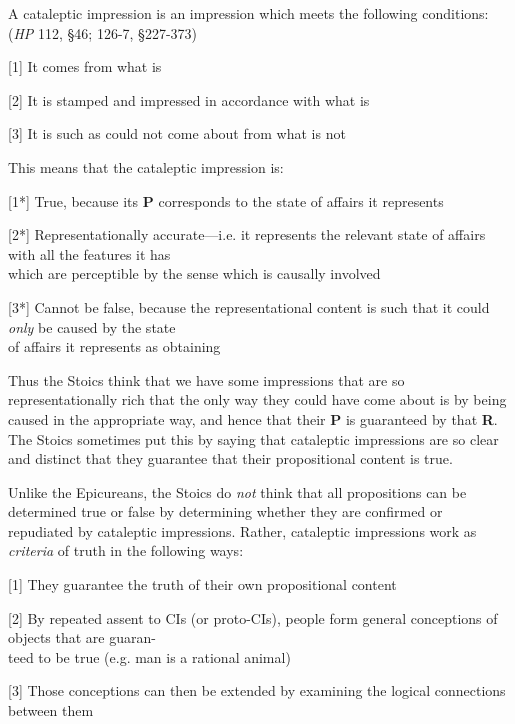\documentclass[11pt]{article}
\begin{document}
\noindent A cataleptic impression is an impression which meets the following conditions: (\emph{HP} 112, \S46; 126-7, \S227-373)
\vspace*{2mm}

[1] It comes from what is
\vspace*{1mm}

[2] It is stamped and impressed in accordance with what is
\vspace*{1mm}

[3] It is such as could not come about from what is not
\vspace*{2mm}

\noindent This means that the cataleptic impression is:
\vspace*{2mm}

[1*] True, because its \textbf{P} corresponds to the state of affairs it represents
\vspace*{1mm}

[2*] Representationally accurate---i.e. it represents the relevant state of affairs with all the features it has\\\hspace*{13mm}which are perceptible by the sense which is causally involved
\vspace*{1mm}

[3*] Cannot be false, because the representational content is such that it could \emph{only} be caused by the state\\\hspace*{13mm}of affairs it represents as obtaining
\vspace*{2mm}

\noindent Thus the Stoics think that we have some impressions that are so representationally rich that the only way they could have come about is by being caused in the appropriate way, and hence that their \textbf{P} is guaranteed by that \textbf{R}. The Stoics sometimes put this by saying that cataleptic impressions are so clear and distinct that they guarantee that their propositional content is true.
\vspace*{2mm}

\noindent Unlike the Epicureans, the Stoics do \emph{not} think that all propositions can be determined true or false by determining whether they are confirmed or repudiated by cataleptic impressions. Rather, cataleptic impressions work as \emph{criteria} of truth in the following ways:
\vspace*{2mm}

[1] They guarantee the truth of their own propositional content
\vspace*{1mm}

[2] By repeated assent to CIs (or proto-CIs), people form general conceptions of objects that are guaran-\\\hspace*{13mm}teed to be true (e.g. man is a rational animal)
\vspace*{1mm}

[3] Those conceptions can then be extended by examining the logical connections between them
\end{document}

